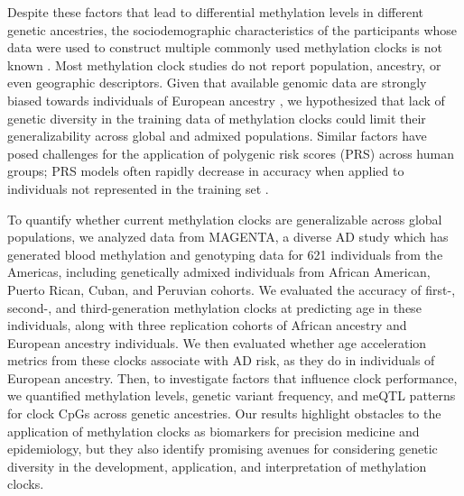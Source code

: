 Despite these factors that lead to differential methylation levels in different genetic ancestries, the sociodemographic characteristics of the participants whose data were used to construct multiple commonly used methylation clocks is not known \citep{watkins_epigenetic_2023}. Most methylation clock studies do not report population, ancestry, or even geographic descriptors. Given that available genomic data are strongly biased towards individuals of European ancestry \citep{sirugo2019missing, popejoy_genomics_2016}, we hypothesized that lack of genetic diversity in the training data of methylation clocks could limit their generalizability across global and admixed populations. Similar factors have posed challenges for the application of polygenic risk scores (PRS) across human groups; PRS models often rapidly decrease in accuracy when applied to individuals not represented in the training set \citep{martin_clinical_2019, prive_portability_2022, novembre_addressing_2022}.

To quantify whether current methylation clocks are generalizable across global populations, we analyzed data from MAGENTA, a diverse AD study which has generated blood methylation and genotyping data for 621 individuals from the Americas, including genetically admixed individuals from African American, Puerto Rican, Cuban, and Peruvian cohorts. We evaluated the accuracy of first-, second-, and third-generation methylation clocks at predicting age in these individuals, along with three replication cohorts of African ancestry and European ancestry individuals. We then evaluated whether age acceleration metrics from these clocks associate with AD risk, as they do in individuals of European ancestry. Then, to investigate factors that influence clock performance, we quantified methylation levels, genetic variant frequency, and meQTL patterns for clock CpGs across genetic ancestries. Our results highlight obstacles to the application of methylation clocks as biomarkers for precision medicine and epidemiology, but they also identify promising avenues for considering genetic diversity in the development, application, and interpretation of methylation clocks.


\clearpage
